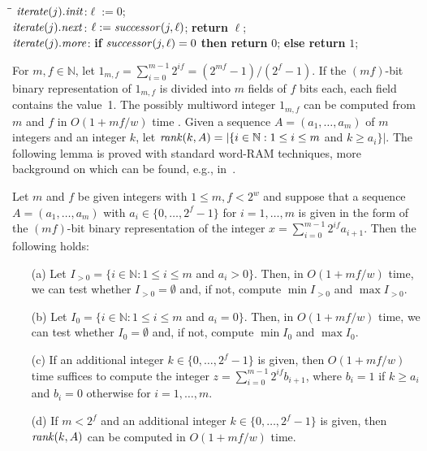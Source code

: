 \documentclass[envcountsame,envcountsect,undated,nolinenumbers]{lnthi}
\def\Tvn#1{\hbox{\textit{#1\/}}}
\def\TbbbN{\mathbb{N}}
\begin{document}
\begin{tabbing}
\quad\=\hskip 3cm\=\kill
\>$\Tvn{iterate}(j).\Tvn{init}$:\>$\ell:=0$;\\
\>$\Tvn{iterate}(j).\Tvn{next}$:\>
 $\ell:=\Tvn{successor}(j,\ell)$; \textbf{return} $\ell$;\\
\>$\Tvn{iterate}(j).\Tvn{more}$:\>
 \textbf{if} $\Tvn{successor}(j,\ell)=0$ \textbf{then return} $0$;
 \textbf{else return} $1$;
\end{tabbing}

For $m,f\in\TbbbN$, let
$1_{m,f}=\sum_{i=0}^{m-1} 2^{i f}
={{(2^{m f}-1)}/{(2^f-1)}}$.
If the $(m f)$-bit binary representation of
$1_{m,f}$ is divided into $m$ fields of
$f$ bits each, each field contains the value~1.
The possibly multiword integer $1_{m,f}$ can be
computed from $m$ and $f$ in $O(1+{{m f}/w})$
time \cite[Theorem 2.5]{Hag15}.
Given a sequence $A=(a_1,\ldots,a_m)$ of
$m$ integers and an integer $k$,
let $\Tvn{rank}(k,A)=|\{i\in\TbbbN:1\le i\le m$ and $k\ge a_i\}|$.
The following lemma is proved with standard
word-RAM techniques,
more background on which can be found,
e.g., in~\cite{Hag98}.

\begin{lemma}
\label{lem:word}Let $m$ and $f$ be given integers
with $1\le m,f<2^w$ and suppose that a
sequence $A=(a_1,\ldots,a_m)$ with
$a_i\in\{0,\ldots,2^f-1\}$ for $i=1,\ldots,m$
is given
in the form of the $(m f)$-bit binary representation
of the integer
$x=\sum_{i=0}^{m-1} 2^{i f}a_{i+1}$.
Then the following holds:
\begin{itemize}
\item[(a)]
Let $I_{>0}=\{i\in\TbbbN:1\le i\le m$ and $a_i>0\}$.
Then, in $O(1+{{m f}/w})$ time,
we can test whether $I_{>0}=\emptyset$ and, if not,
compute $\min I_{>0}$ and $\max I_{>0}$.
\item[(b)]
Let $I_0=\{i\in\TbbbN:1\le i\le m$ and $a_i=0\}$.
Then, in $O(1+{{m f}/w})$ time,
we can test whether $I_0=\emptyset$ and, if not,
compute $\min I_0$ and $\max I_0$.
\item[(c)]
If an additional integer $k\in\{0,\ldots,2^f-1\}$
is given, then $O(1+{{m f}/w})$ time
suffices to compute the integer
$z=\sum_{i=0}^{m-1}2^{i f}b_{i+1}$, where
$b_i=1$ if $k\ge a_i$ and $b_i=0$ otherwise
for $i=1,\ldots,m$.
\item[(d)]
If $m<2^f$ and
an additional integer $k\in\{0,\ldots,2^f-1\}$
is given, then $\Tvn{rank}(k,A)$
can be computed
in $O(1+{{m f}/w})$ time.
\end{itemize}
\end{lemma}
\end{document}
